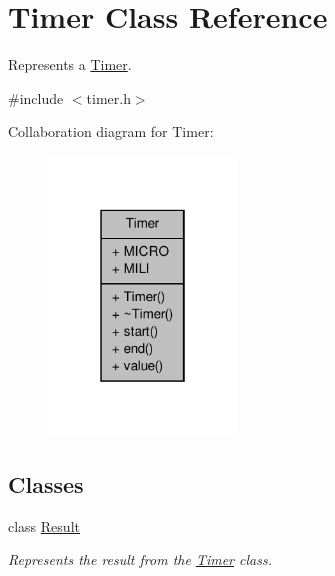 \hypertarget{classTimer}{\section{Timer Class Reference}
\label{classTimer}
}


Represents a \hyperlink{classTimer}{Timer}.  




{\ttfamily \#include $<$timer.\-h$>$}



Collaboration diagram for Timer\-:\nopagebreak
\begin{figure}[H]
\begin{center}
\leavevmode
\includegraphics[width=142pt]{classTimer__coll__graph}
\end{center}
\end{figure}
\subsection*{Classes}
\begin{DoxyCompactItemize}
\item 
class \hyperlink{classTimer_1_1Result}{Result}
\begin{DoxyCompactList}\small\item\em Represents the result from the \hyperlink{classTimer}{Timer} class. \end{DoxyCompactList}\end{DoxyCompactItemize}
